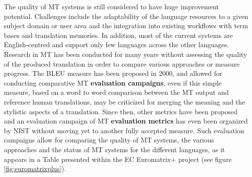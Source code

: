 \begin{multicols}{2}
The quality of MT systems is still considered to have huge improvement
potential. Challenges include the adaptability of the language
resources to a given subject domain or user area and the integration
into existing workflows with term bases and translation memories. In
addition, most of the current systems are English-centred and support
only few languages across the other languages. Research in MT has been
conducted for many years without assessing the quality of the produced
translation in order to compare various approaches or measure
progress. The BLEU measure has been proposed in 2000\cite{bleu02}, and allowed for
conducting comparative MT {\bf evaluation campaigns}, even if this simple
measure, based on a word to word comparison between the MT output and
reference human translations, may be criticized for merging the
meaning and the stylistic aspects of a translation. Since then, other
metrics have been proposed and an evaluation campaign of MT {\bf evaluation
metrics} has even been organized by NIST without moving yet to another
fully accepted measure. Such evaluation campaigns allow for comparing
the quality of MT systems, the various approaches and the status of MT
systems for the different languages, as it appears in a Table
presented within the EC Euromatrix+ project (see figure \ref{fig:euromatrixplus}).



\end{multicols}
